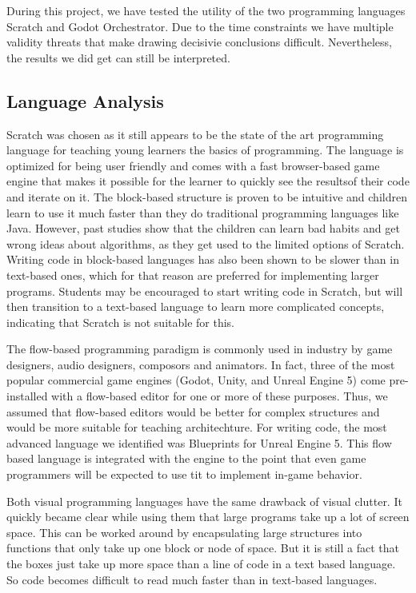 During this project, we have tested the utility of the two
programming languages Scratch and Godot Orchestrator.
Due to the time
constraints we have multiple validity threats that make drawing
decisivie conclusions difficult.
Nevertheless, the results we did get
can still be interpreted.

\subsection{Language Analysis}
Scratch was chosen as it still appears to be the state of the art
programming language for teaching young learners the basics of
programming.
The language is optimized for being user friendly and
comes with a fast browser-based game engine that makes it possible
for the learner to quickly see the resultsof their code and iterate
on it.
The block-based structure is proven to be intuitive and
children learn to use it much faster than they do traditional
programming languages like Java.
However, past studies show that the
children can learn bad habits and get wrong ideas about algorithms,
as they get used to the limited options of Scratch.
Writing code in
block-based languages has also been shown to be slower than in
text-based ones, which for that reason are preferred for implementing
larger programs.
Students may be encouraged to start writing code in
Scratch, but will then transition to a text-based language to learn
more complicated concepts, indicating that Scratch is not suitable
for this.

The flow-based programming paradigm is commonly used in industry by
game designers, audio designers, composors and animators.
In fact,
three of the most popular commercial game engines (Godot, Unity, and
Unreal Engine 5) come pre-installed with a flow-based editor for one
or more of these purposes.
Thus, we assumed that flow-based editors
would be better for complex structures and would be more suitable for
teaching architechture.
For writing code, the most advanced language
we identified was Blueprints for Unreal Engine 5.
This flow based
language is integrated with the engine to the point that even game
programmers will be expected to use tit to implement in-game
behavior.

Both visual programming languages have the same drawback of visual
clutter.
It quickly became clear while using them that large programs
take up a lot of screen space. This can be worked around by
encapsulating large structures into functions that only take up one block or node of space.
But it is still a fact that the boxes just
take up more space than a line of code in a text based language.
So
code becomes difficult to read much faster than in text-based
languages.

